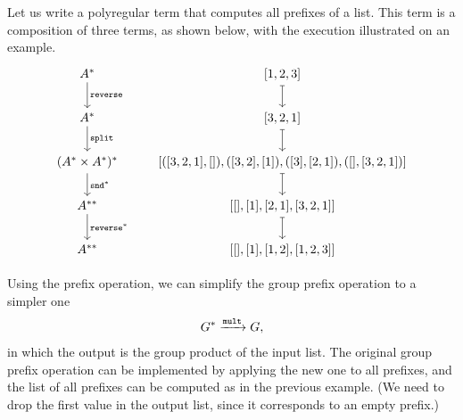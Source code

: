\begin{myexample}[Prefixes]
    \label{ex:all-prefixes} Let us write a polyregular term that computes all prefixes of a list. This term is a composition of three terms, as shown below, with the execution illustrated on an example.
    \[
    \begin{tikzcd}
    A^* 
    \ar[d,"{\reverseterm}"]
    &
    {[1,2,3]}
    \ar[d,mapsto]
    \\
    A^*
    \ar[d,"{\splitterm}"]
    &
    {[3,2,1]}
    \ar[d,mapsto]
    \\
    (A^* \times A^*)^*
    \ar[d,"{\sndterm^*}"]
    & 
    {[([3,2,1],[]),  ([3,2],[1]),  ([3],[2,1]),  ([],[3,2,1])]} 
    \ar[d,mapsto]
    \\
    A^{**}
    \ar[d,"{\reverseterm^*}"]
    &
    {[[],  [1],  [2,1],  [3,2,1]]} 
    \ar[d,mapsto]
    \\
    A^{**}
    & 
    {[[],  [1],  [1,2],  [1,2,3]]}
    \end{tikzcd}
    \]
\end{myexample}

\begin{myexample}
    \label{ex:groups-simpler}
    Using the prefix operation, we can simplify the group prefix operation to a simpler one 
    \begin{align*}
    G^* \xrightarrow{\mathtt{mult}} G,
    \end{align*}
    in which the output is the group product of the input list. The original group prefix operation can be implemented by applying the new one to all prefixes, and the list of all prefixes can be computed as in the previous example. (We need to drop the first value in the output list, since it corresponds to an empty prefix.)
\end{myexample}

